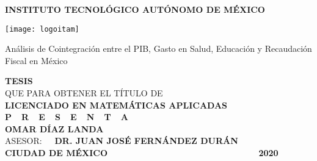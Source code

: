 \begin{titlepage}
    \begin{center}
        
        \vspace{0.2cm}

        \large
        \textbf{INSTITUTO TECNOL\'OGICO AUT\'ONOMO DE M\'EXICO}

        \vspace{1.2cm}
        
        \texttt{[image: logoitam]}
        
        \vspace{0.8cm}
        \LARGE
        Análisis de Cointegración entre el PIB, Gasto en Salud, Educación y Recaudación Fiscal en México
        
        \vspace{1.1cm}
        
        \normalsize \textbf{TESIS}\\ QUE PARA OBTENER EL T\'ITULO DE\\ \textbf{LICENCIADO EN MATEM\'ATICAS APLICADAS}\\[0.8cm]
        \normalsize \textbf{P\ \  R\ \  E\ \  S\ \  E\ \  N\ \  T\ \  A}\\[0.8cm]

        \textbf{OMAR D\'IAZ LANDA}\\[1.0cm]

        \normalsize ASESOR: \textbf{\ \ DR. JUAN JOSÉ FERN\'ANDEZ DUR\'AN}\\[1.0cm]

        \normalsize \textbf{CIUDAD DE MÉXICO} {\ \ \ \ \ \ \ \ \ \ \ \ \ \ \ \ \ \ \ \ \ \ \ \ \ \ \ \ \ \ \ \ \ \ } \textbf{2020}
    \end{center}
\end{titlepage}